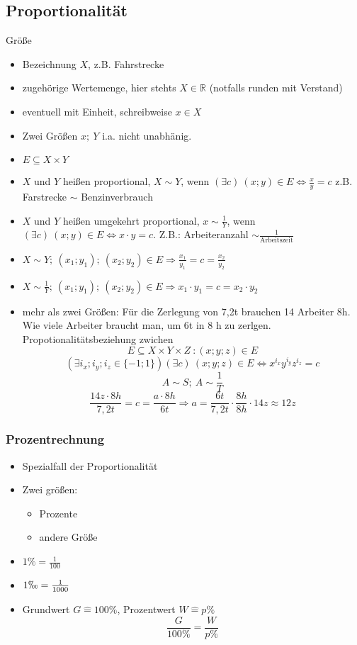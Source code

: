 \subsection{Proportionalität}
Größe
\begin{itemize}
    \item Bezeichnung $X$, z.B. Fahrstrecke
    \item zugehörige Wertemenge, hier stehts $X\in \mathbb{R}$ (notfalls runden mit Verstand)
    \item eventuell mit Einheit, schreibweise $x \in X$
    \item Zwei Größen $x;\ Y$ i.a. nicht unabhänig.
    \item $E \subseteq X \times Y$
    \item $X$ und $Y$ heißen proportional, $X \sim Y$, wenn $(\exists c)\ (x;y) \in E \Leftrightarrow \frac{x}{y}=c$ z.B. Farstrecke $\sim$ Benzinverbrauch
    \item $X$ und $Y$ heißen umgekehrt proportional, $x \sim \frac{1}{Y}$, wenn $(\exists c)\ (x;y) \in E \Leftrightarrow x \cdot y = c$. Z.B.: Arbeiteranzahl $\sim \frac{1}{\textrm{Arbeitszeit}}$
    \item $X \sim Y;\ (x_1;y_1);\ (x_2;y_2) \in E \Rightarrow \frac{x_1}{y_1} = c = \frac{x_2}{y_2}$
    \item $X \sim \frac{1}{Y};\ (x_1;y_1);\ (x_2;y_2) \in E \Rightarrow x_1 \cdot y_1 = c = x_2 \cdot y_2$
    \item mehr als zwei Größen: Für die Zerlegung von 7,2t brauchen 14 Arbeiter 8h. Wie viele Arbeiter braucht man, um 6t in 8 h zu zerlgen. \\
    Propotionalitätsbeziehung zwichen $$E \subseteq X \times  Y \times Z\ : (x; y; z) \in E$$ $$(\exists i_x; i_y; i_z \in \lbrace -1; 1 \rbrace) (\exists c)\ (x;y;z) \in E \Leftrightarrow x^{i_x}y^{i_y}z^{i_z} = c$$
    $$A \sim S;\ A \sim \frac{1}{T}$$
    $$\frac{14z \cdot 8h}{7{,}2t}=c=\frac{a \cdot 8h}{6t} \Rightarrow a = \frac{6t}{7{,}2t}\cdot \frac{8h}{8h} \cdot 14z \approx 12z$$
\end{itemize}
\subsubsection{Prozentrechnung}
\begin{itemize}
    \item Spezialfall der Proportionalität
    \item Zwei größen:\
    \begin{itemize}
        \item Prozente
        \item andere Größe
    \end{itemize}
    \item $1\% = \frac{1}{100}$
    \item $1\permil = \frac{1}{1000}$
    \item Grundwert $G \hat{=} 100\%$, Prozentwert $W \hat{=} p\%$
    $$\frac{G}{100\%} = \frac{W}{p\%}$$
\end{itemize}
